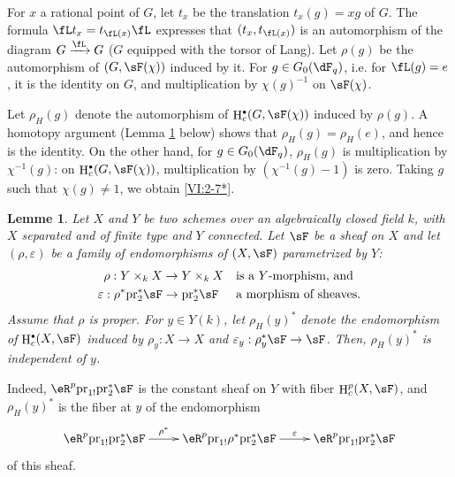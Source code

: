 \documentclass[oneside]{book}
\DeclareMathOperator{\h}{H}
\newcommand{\pr}{\mathrm{pr}} %
\theoremstyle{sga-source}
\theoremstyle{sga-source-dash}
\theoremstyle{sga-source-dotdash}
\theoremstyle{sga-source-number-note-dash}
\theoremstyle{sga-source-note-number-dotdash}
\theoremstyle{sga-source-example-dotdash}
\theoremstyle{sga-source-inline-number}
\theoremstyle{sga-source-bare-number}
\theoremstyle{sga-source}
\newtheorem{lemma_}[subsection]{Lemme}
\let\oldbullet\bullet
\renewcommand{\bullet}{\textnormal{\tiny$\oldbullet$}}
\newcommand{\PrintPage}[1]{}\newcommand{\MathPage}[1]{}\newcommand{\PrintCite}[2]{#1}\newcommand{\var}[3]{#2}
\begin{document}
For $x$ a rational point of $G$, let $t_x$ be the translation $t_x(g) = x g$ 
of $G$. The formula $\fL t_x = t_{\fL(x)} \fL$ expresses that $(t_x,t_{\fL(x)})$ 
is an automorphism of the diagram $G\xrightarrow\fL G$ ($G$ equipped with the torsor of 
Lang). Let $\rho(g)$ be the automorphism of $(G,\sF(\chi))$ induced by it. 
For $g\in G_0(\dF_q)$, i.e. for $\fL(g) = e$, it is the identity on $G$, and 
multiplication by $\chi(g)^{-1}$ on $\sF(\chi)$. 

Let $\rho_H(g)$ denote the automorphism of $\h_c^\bullet(G,\sF(\chi))$ induced by 
$\rho(g)$. A homotopy argument (Lemma \ref{VI:2-8} below) shows that 
$\rho_H(g) = \rho_H(e)$, and hence is the identity. On the other hand, for 
$g\in G_0(\dF_q)$, $\rho_H(g)$ is multiplication by 
$\var{(\chi^{-1}(g)}{\chi^{-1}(g)}{S45-SOL-0748}$: on $\var{\h^\bullet(G,\sF(\chi))}{\h_c^\bullet(G,\sF(\chi))}{S45-SOL-0749}$, multiplication by 
$(\chi^{-1}(g)-1)$ is zero. Taking $g$ such that $\chi(g)\ne 1$, we obtain 
\ref{VI:2-7*}. 





\begin{lemma_}\label{VI:2-8}
Let $X$ and $Y$ be two schemes over an algebraically closed field $k$, with $X$ 
separated and of finite type and $Y$ connected. Let $\sF$ be a sheaf on $X$ and 
let $(\rho,\varepsilon)$ be a family of endomorphisms of $(X,\sF)$ parametrized 
by $Y$: 
\begin{align*} 
  \rho:Y\times_k X &\to Y\times_k X && \text{is a $Y$-morphism, and} \\
  \varepsilon:\rho^\ast \pr_2^\ast \sF &\to \pr_2^\ast\sF && \text{a morphism of sheaves.} 
\end{align*}
Assume that $\rho$ is proper. For $y\in Y(k)$, let $\rho_H(y)^\ast$ denote 
the endomorphism of $\h_c^\bullet(X,\sF)$ induced by $\rho_y:X\to X$ and 
$\varepsilon_y:\rho_y^\ast\sF\to \sF$. Then, $\rho_H(y)^\ast$ is 
independent of $y$. 
\end{lemma_}

Indeed, $\eR^p \pr_{1!} \pr_2^\ast\sF$ is the 
constant sheaf on $Y$ with fiber \PrintPage{188}
$\var{\h^p(X,\sF)}{\h_c^p(X,\sF)}{S45-SOL-0750}$, and $\rho_H(y)^\ast$ is the 
fiber at $y$ of the endomorphism 
\[\xymatrix{
  \eR^p \pr_{1!} \pr_2^\ast \sF \ar[r]^-{\rho^\ast} 
    & \eR^p \pr_{1!} \rho^\ast \pr_2^\ast \sF \ar[r]^-\varepsilon 
    & \eR^p \pr_{1!} \pr_2^\ast \sF 
}\]
of this sheaf. 
\end{document}
